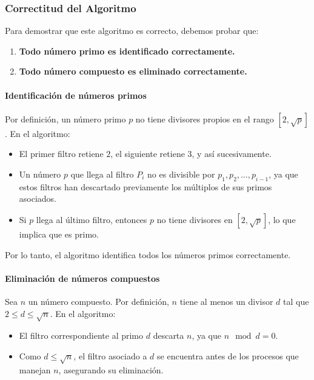 \documentclass[a4paper,12pt]{article}
\begin{document}
\subsubsection{Correctitud del Algoritmo}

Para demostrar que este algoritmo es correcto, debemos probar que:

\begin{enumerate}
    \item \textbf{Todo número primo es identificado correctamente.}
    \item \textbf{Todo número compuesto es eliminado correctamente.}
\end{enumerate}

\paragraph{Identificación de números primos}

Por definición, un número primo \( p \) no tiene divisores propios en el rango \( [2, \sqrt{p}] \). En el algoritmo:
\begin{itemize}
    \item El primer filtro retiene \( 2 \), el siguiente retiene \( 3 \), y así sucesivamente.
    \item Un número \( p \) que llega al filtro \( P_i \) no es divisible por \( p_1, p_2, \ldots, p_{i-1} \), ya que estos filtros han descartado previamente los múltiplos de sus primos asociados.
    \item Si \( p \) llega al último filtro, entonces \( p \) no tiene divisores en \( [2, \sqrt{p}] \), lo que implica que es primo.
\end{itemize}

Por lo tanto, el algoritmo identifica todos los números primos correctamente.

\paragraph{Eliminación de números compuestos}

Sea \( n \) un número compuesto. Por definición, \( n \) tiene al menos un divisor \( d \) tal que \( 2 \leq d \leq \sqrt{n} \). En el algoritmo:
\begin{itemize}
    \item El filtro correspondiente al primo \( d \) descarta \( n \), ya que \( n \mod d = 0 \).
    \item Como \( d \leq \sqrt{n} \), el filtro asociado a \( d \) se encuentra antes de los procesos que manejan \( n \), asegurando su eliminación.
\end{itemize}
\end{document}
